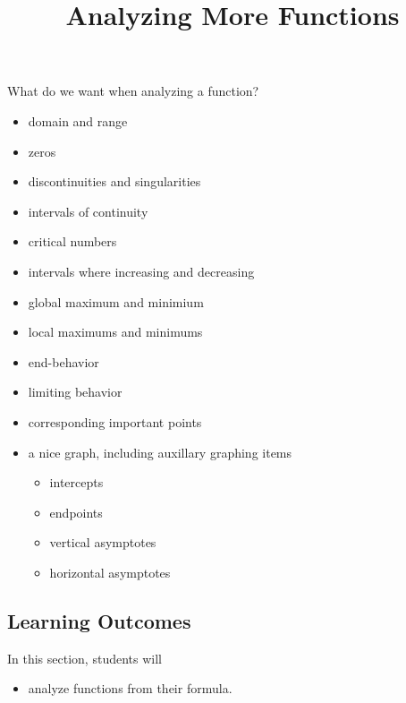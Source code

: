 \documentclass{ximera}
\title{Analyzing More Functions}
\begin{document}
\begin{abstract}
%
\end{abstract}
\maketitle






What do we want when analyzing a function?


\begin{itemize}
\item domain and range
\item zeros 
\item discontinuities and singularities
\item intervals of continuity
\item critical numbers
\item intervals where increasing and decreasing
\item global maximum and minimium
\item local maximums and minimums
\item end-behavior
\item limiting behavior
\item corresponding important points
\item a nice graph, including auxillary graphing items
\begin{itemize}
	\item intercepts
	\item endpoints
	\item vertical asymptotes
	\item horizontal asymptotes
\end{itemize}
\end{itemize}









\subsection{Learning Outcomes}



\begin{sectionOutcomes}
In this section, students will 

\begin{itemize}
\item analyze functions from their formula.
\end{itemize}
\end{sectionOutcomes}
\end{document}
